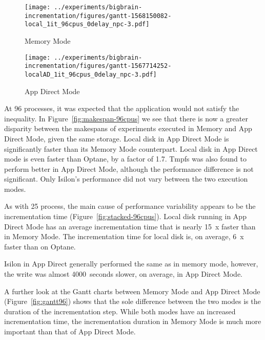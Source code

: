 \documentclass[conference]{IEEEtran}
\begin{document}
\begin{figure*}
    \begin{subfigure}{\columnwidth}
        \centering
    \texttt{[image: ../experiments/bigbrain-incrementation/figures/gantt-1568150082-local\_1it\_96cpus\_0delay\_npc-3.pdf]}
    \caption{Memory Mode}
\end{subfigure}
\begin{subfigure}{\columnwidth}
        \centering
    \texttt{[image: ../experiments/bigbrain-incrementation/figures/gantt-1567714252-localAD\_1it\_96cpus\_0delay\_npc-3.pdf]}
    \caption{App Direct Mode}
\end{subfigure}
\caption{Gantt charts for local disk processing 125 blocks of the 40$\mu$m BigBrain using 96 processes with no delay}\label{fig:gantt96}
\end{figure*}

At 96 processes, it was expected that the application would not satisfy the inequality.
In Figure~\ref{fig:makespan-96cpus} we see that there is now a greater disparity between the
makespans of experiments executed in Memory and App Direct Mode, given the same storage. Local disk
in App Direct Mode is significantly faster than its Memory Mode counterpart. Local disk in App Direct
mode is even faster than Optane, by a factor of 1.7. Tmpfs was also found to perform better in App Direct Mode, although
the performance difference is not significant. Only Isilon's performance did not vary between the
two execution modes.

As with 25 process, the main cause of performance variability appears to be the incrementation
time (Figure~\ref{fig:stacked-96cpus}). Local disk running in App Direct Mode has an average
incrementation time that is nearly 15~x faster than in Memory Mode. The incrementation time
for local disk is, on average, 6~x faster than on Optane.

Isilon in App Direct generally performed the same as in memory mode, however, the write
was almost 4000~seconds slower, on average, in App Direct Mode.

A further look at the Gantt charts between Memory Mode and App Direct Mode (Figure~\ref{fig:gantt96})
shows that the sole difference between the two modes is the duration of the incrementation step.
While both modes have an increased incrementation time, the incrementation duration in
Memory Mode is much more important than that of App Direct Mode.
\end{document}
